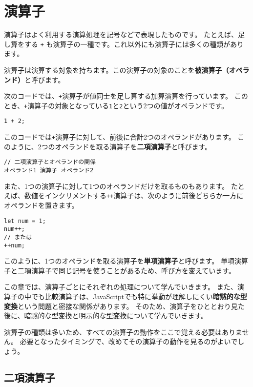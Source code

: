 \hypertarget{operator}{%
\chapter{演算子}\label{operator}}
\thispagestyle{frontheadings}

演算子はよく利用する演算処理を記号などで表現したものです。
たとえば、足し算をする \texttt{+}
も演算子の一種です。これ以外にも演算子には多くの種類があります。

演算子は演算する対象を持ちます。この演算子の対象のことを\textbf{被演算子（オペランド）}と呼びます。

次のコードでは、\texttt{+}演算子が値同士を足し算する加算演算を行っています。
このとき、\texttt{+}演算子の対象となっている\texttt{1}と\texttt{2}という2つの値がオペランドです。

\begin{lstlisting}
1 + 2;
\end{lstlisting}

このコードでは\texttt{+}演算子に対して、前後に合計2つのオペランドがあります。
このように、2つのオペランドを取る演算子を\textbf{二項演算子}と呼びます。

\begin{lstlisting}
// 二項演算子とオペランドの関係
オペランド1 演算子 オペランド2
\end{lstlisting}

また、1つの演算子に対して1つのオペランドだけを取るものもあります。
たとえば、数値をインクリメントする\texttt{++}演算子は、次のように前後どちらか一方にオペランドを置きます。

\begin{lstlisting}
let num = 1;
num++;
// または
++num;
\end{lstlisting}

このように、1つのオペランドを取る演算子を\textbf{単項演算子}と呼びます。
単項演算子と二項演算子で同じ記号を使うことがあるため、呼び方を変えています。

この章では、演算子ごとにそれぞれの処理について学んでいきます。
また、演算子の中でも比較演算子は、JavaScriptでも特に挙動が理解しにくい\textbf{暗黙的な型変換}という問題と密接な関係があります。
そのため、演算子をひととおり見た後に、暗黙的な型変換と明示的な型変換について学んでいきます。

演算子の種類は多いため、すべての演算子の動作をここで覚える必要はありません。
必要となったタイミングで、改めてその演算子の動作を見るのがよいでしょう。

\hypertarget{binary-operator}{%
\section{二項演算子}\label{binary-operator}}

